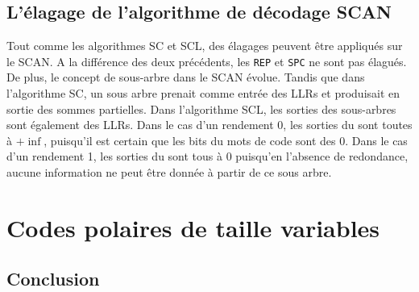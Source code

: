 \subsection{L'élagage de l'algorithme de décodage SCAN}
Tout comme les algorithmes SC et SCL, des élagages peuvent être appliqués sur le SCAN. A la différence des deux précédents, les \noeuds \texttt{REP} et \texttt{SPC} ne sont pas élagués. De plus, le concept de sous-arbre dans le SCAN évolue. Tandis que dans l'algorithme SC, un sous arbre prenait comme entrée des LLRs et produisait en sortie des sommes partielles. Dans l'algorithme SCL, les sorties des sous-arbres sont également des LLRs. Dans le cas d'un rendement 0, les sorties du \noeud sont toutes à $+\inf$, puisqu'il est certain que les bits du mots de code sont des $0$. Dans le cas d'un rendement 1, les sorties du \noeud sont tous à $0$ puisqu'en l'absence de redondance, aucune information ne peut être donnée à partir de ce sous arbre.

\section{Codes polaires de taille variables}


\subsection*{Conclusion}
{}